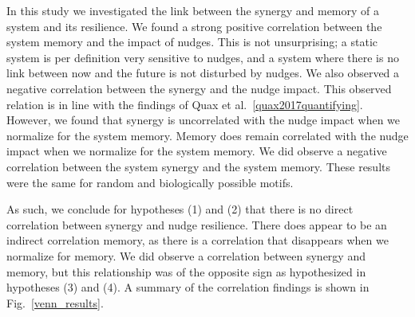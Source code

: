 \documentclass[../main.tex]{subfiles}
\begin{document}


In this study we investigated the link between the synergy and memory of a system and its resilience.
We found a strong positive correlation between the system memory and the impact of nudges.
This is not unsurprising; a static system is per definition very sensitive to nudges, and a system where there is no link between now and the future is not disturbed by nudges.
We also observed a negative correlation between the synergy and the nudge impact.
This observed relation is in line with the findings of Quax et al.~\ref{quax2017quantifying}.
However, we found that synergy is uncorrelated with the nudge impact when we normalize for the system memory.
Memory does remain correlated with the nudge impact when we normalize for the system memory.
We did observe a negative correlation between the system synergy and the system memory.
These results were the same for random and biologically possible motifs.

As such, we conclude for hypotheses (1) and (2) that there is no direct correlation between synergy and nudge resilience.
There does appear to be an indirect correlation memory, as there is a correlation that disappears when we normalize for memory.
We did observe a correlation between synergy and memory, but this relationship was of the opposite sign as hypothesized in hypotheses (3) and (4).
A summary of the correlation findings is shown in Fig.~\ref{venn_results}.
\end{document}
